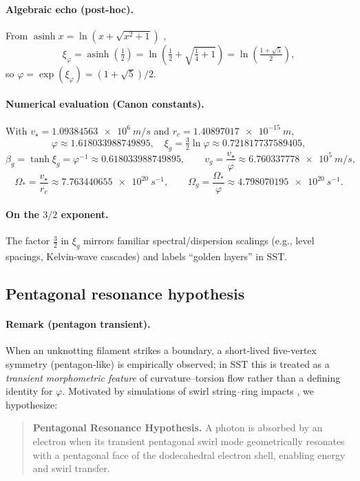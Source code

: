 \documentclass[smallextended]{svjour3}       %
\providecommand{\rc}{r_c}
\newcommand{\vstar}{v_\star}                           %
\begin{document}
	\paragraph*{Algebraic echo (post-hoc).}
	From \(\operatorname{asinh}x=\ln(x+\sqrt{x^2+1})\) \cite{NISTDLMF},
	\[
		\xi_\varphi=\operatorname{asinh}\!\left(\tfrac{1}{2}\right)
		=\ln\!\left(\tfrac{1}{2}+\sqrt{\tfrac{1}{4}+1}\right)
		=\ln\!\left(\tfrac{1+\sqrt5}{2}\right),
	\]
	so \(\varphi=\exp(\xi_\varphi)=(1+\sqrt5)/2\).

	\paragraph*{Numerical evaluation (Canon constants).}
	With \(\vstar=\SI{1.09384563e6}{m/s}\) and \(\rc=\SI{1.40897017e-15}{m}\),
	\[
		\varphi \approx 1.618033988749895,\quad
		\xi_g=\tfrac{3}{2}\ln\varphi \approx 0.721817737589405,
	\]
	\[
		\beta_g=\tanh\xi_g=\varphi^{-1}\approx 0.618033988749895,\qquad
		v_g=\frac{\vstar}{\varphi}\approx \SI{6.760337778e5}{m/s},
	\]
	\[
		\Omega_{\!*}=\frac{\vstar}{\rc}\approx \SI{7.763440655e20}{s^{-1}},\qquad
		\Omega_g=\frac{\Omega_{\!*}}{\varphi}\approx \SI{4.798070195e20}{s^{-1}}.
	\]

	\paragraph*{On the \(3/2\) exponent.}
	The factor \(\tfrac{3}{2}\) in \(\xi_g\) mirrors familiar spectral/dispersion scalings (e.g., level spacings, Kelvin-wave cascades) and labels “golden layers” in SST.

	\subsection{Pentagonal resonance hypothesis}
	\paragraph*{Remark (pentagon transient).}
	When an unknotting filament strikes a boundary, a short-lived five-vertex symmetry (pentagon-like) is empirically observed; in SST this is treated as a \emph{transient morphometric feature} of curvature–torsion flow rather than a defining identity for \(\varphi\). Motivated by simulations of swirl string–ring impacts \cite{orlandi1993vortex}, we hypothesize:
	\begin{quote}
		\textbf{Pentagonal Resonance Hypothesis.}
		A photon is absorbed by an electron when its transient pentagonal swirl mode geometrically resonates with a pentagonal face of the dodecahedral electron shell, enabling energy and swirl transfer.
	\end{quote}
\end{document}
